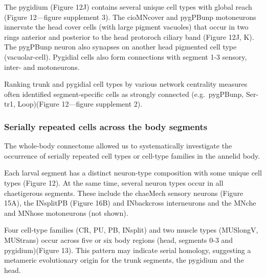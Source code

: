 \documentclass[
  11pt,
]{article}
\begin{document}
The pygidium (Figure 12J) contains several unique cell types with global
reach (Figure 12---figure supplement 3). The cioMNcover and pygPBunp
motoneurons innervate the head cover cells (with large pigment vacuoles)
that occur in two rings anterior and posterior to the head protoroch
ciliary band (Figure 12J, K). The pygPBunp neuron also synapses on
another head pigmented cell type (vacuolar-cell). Pygidial cells also
form connections with segment 1-3 sensory, inter- and motoneurons.

Ranking trunk and pygidial cell types by various network centrality
measures often identified segment-specific cells as strongly connected
(e.g.~pygPBunp, Ser-tr1, Loop)(Figure 12---figure supplement 2).

\subsubsection{Serially repeated cells across the body
segments}\label{serially-repeated-cells-across-the-body-segments}

The whole-body connectome allowed us to systematically investigate the
occurrence of serially repeated cell types or cell-type families in the
annelid body.

Each larval segment has a distinct neuron-type composition with some
unique cell types (Figure 12). At the same time, several neuron types
occur in all chaetigerous segments. These include the chaeMech sensory
neurons (Figure 15A), the INsplitPB (Figure 16B) and INbackcross
interneurons and the MNche and MNhose motoneurons (not shown).

Four cell-type families (CR, PU, PB, INsplit) and two muscle types
(MUSlongV, MUStrans) occur across five or six body regions (head,
segments 0-3 and pygidium)(Figure 13). This pattern may indicate serial
homology, suggesting a metameric evolutionary origin for the trunk
segments, the pygidium and the head.
\end{document}
